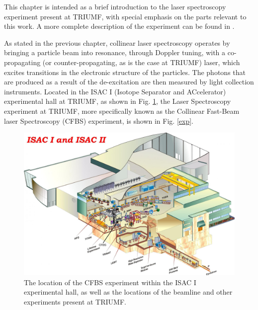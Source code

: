 \noindent This chapter is intended as a brief introduction to the laser spectroscopy experiment present at TRIUMF, with special emphasis on the parts relevant to this work. A more complete description of the experiment can be found in \cite{CFBS}.

As stated in the previous chapter, collinear laser spectroscopy operates by bringing a particle beam into resonance, through Doppler tuning, with a co-propagating (or counter-propagating, as is the case at TRIUMF) laser, which excites transitions in the electronic structure of the particles. The photons that are produced as a result of the de-excitation are then measured by light collection instruments. Located in the ISAC I (Isotope Separator and ACcelerator) experimental hall at TRIUMF, as shown in Fig. \ref{loc}, the Laser Spectroscopy experiment at TRIUMF, more specifically known as the Collinear Fast-Beam laser Spectroscopy (CFBS) experiment, is shown in Fig. \ref{exp}. 


\begin{figure}[h]
\includegraphics[width=\textwidth]{Laser_spec_triumf/ISAC.png}
\caption[The location of the CFBS experiment]{\small The location of the CFBS experiment within the ISAC I experimental hall, as well as the locations of the beamline and other experiments present at TRIUMF.}
\label{loc}
\end{figure}

